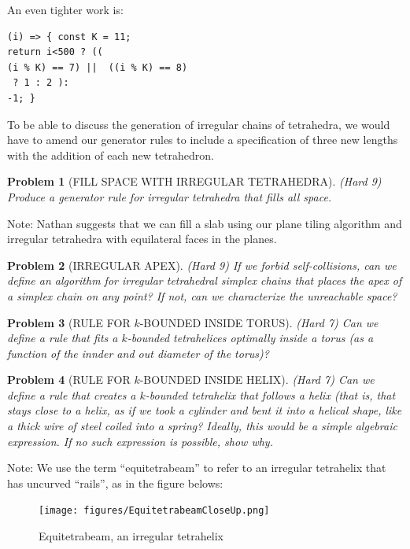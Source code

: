 \documentclass[11pt]{article}
\newtheorem{problem}{Problem}
\begin{document}
An even tighter work is:
\begin{verbatim}
(i) => { const K = 11;
return i<500 ? ((
(i % K) == 7) ||  ((i % K) == 8) 
 ? 1 : 2 ): 
-1; }
\end{verbatim}

To be able to discuss the generation of irregular chains of tetrahedra, we would have to amend our generator rules to include a specification
of three new lengths with the addition of each new tetrahedron.

\begin{problem}[FILL SPACE WITH IRREGULAR TETRAHEDRA]
(Hard 9) Produce a generator rule for irregular tetrahedra that fills all space.
\end{problem}

Note: Nathan suggests that we can fill a slab using our plane tiling algorithm and irregular tetrahedra with equilateral faces in the planes.

\begin{problem}[IRREGULAR APEX]
  (Hard 9) If we forbid self-collisions, can we define an algorithm for irregular tetrahedral simplex chains that places the apex
  of a simplex chain on any point? If not, can we characterize the unreachable space?
\end{problem}

\begin{problem}[RULE FOR $k$-BOUNDED INSIDE TORUS]
(Hard 7) Can we define a rule that fits a $k$-bounded tetrahelices optimally inside a torus (as a function of the innder and out diameter of the torus)?  
\end{problem}

\begin{problem}[RULE FOR $k$-BOUNDED INSIDE HELIX]
\item (Hard 7) Can we define a rule that creates a $k$-bounded tetrahelix that follows a helix (that is, that stays close to a helix, as if we took a cylinder and bent it into a helical shape, like a thick wire of
steel coiled into a spring? Ideally, this would be a simple algebraic expression. If no such expression is possible, show why.
\end{problem}

Note: We use the term ``equitetrabeam'' to refer to an irregular tetrahelix that has uncurved ``rails'', as in the figure belows:

\begin{figure}
     \centering
     \texttt{[image: figures/EquitetrabeamCloseUp.png]}
     \caption{Equitetrabeam, an irregular tetrahelix}
  \label{fig:equitetrabeam}
\end{figure}
\end{document}
